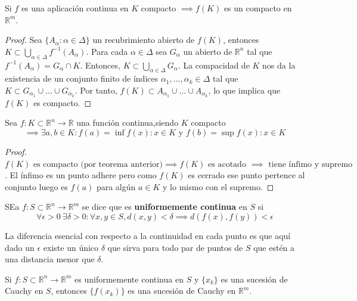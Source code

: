 \begin{teorema}
    Si $f$ es una aplicación continua en $K$ compacto $\implies f(K)$ es un compacto en $\mathbb{R}^m$.
\end{teorema}

\begin{proof}
    Sea $\{A_{\alpha} : \alpha \in \Delta\}$ un recubrimiento abierto de $f(K)$, entonces $K \subset \bigcup_{\alpha \in \Delta} f^{-1}(A_{\alpha})$. Para cada $\alpha \in \Delta$ sea $G_{\alpha}$ un abierto de $\mathbb{R}^n$ tal que $f^{-1}(A_{\alpha}) = G_{\alpha} \cap K$. Entonces, $K \subset \bigcup_{\alpha \in \Delta} G_{\alpha}$. La compacidad de $K$ nos da la existencia de un conjunto finito de índices $\alpha_1, \ldots, \alpha_k \in \Delta$ tal que $K \subset G_{\alpha_1} \cup \ldots \cup G_{\alpha_k}$. Por tanto, $f(K) \subset A_{\alpha_1} \cup \ldots \cup A_{\alpha_k}$, lo que implica que $f(K)$ es compacto.
\end{proof}

\begin{teorema}
    Sea $f: K \subset \mathbb{R}^n \to \mathbb{R}$ una función continua,siendo $K$ compacto $$\implies \exists a, b \in K : f(a) = \inf{f(x) : x \in K} \text{ y } f(b) = \sup{f(x) : x \in K}$$
\end{teorema}
\begin{proof}
    $f(K) \text{ es compacto (por teorema anterior)} \implies f(K) \text{ es acotado } \implies \text{ tiene ínfimo y supremo}$. El ínfimo es un punto adhere pero como $f(K)$ es cerrado ese punto pertence al conjunto luego es $f(a)$ para algún $a \in K$ y lo mismo con el supremo. 
\end{proof}


\begin{definición}
    SEa $f: S \subset \mathbb{R}^n \to \mathbb{R}^m$ se dice que es \textbf{uniformemente continua} en $S$ si
    $$\forall \epsilon > 0 \ \exists \delta > 0 : \forall x, y \in S, d(x, y) < \delta \implies d(f(x), f(y)) < \epsilon$$
\end{definición}

\begin{observación}
    La diferencia esencial con respecto a la continuidad en cada punto es que aquí dado un $\epsilon$ existe un único $\delta$ que sirva para todo par de puntos de $S$ que estén a una distancia menor que $\delta$.
\end{observación}

\begin{teorema}
    Si $f: S \subset \mathbb{R}^n \to \mathbb{R}^m$ es uniformemente continua en $S$ y $\{x_k\}$ es una sucesión de Cauchy en $S$, entonces $\{f(x_k)\}$ es una sucesión de Cauchy en $\mathbb{R}^m$.
\end{teorema}

